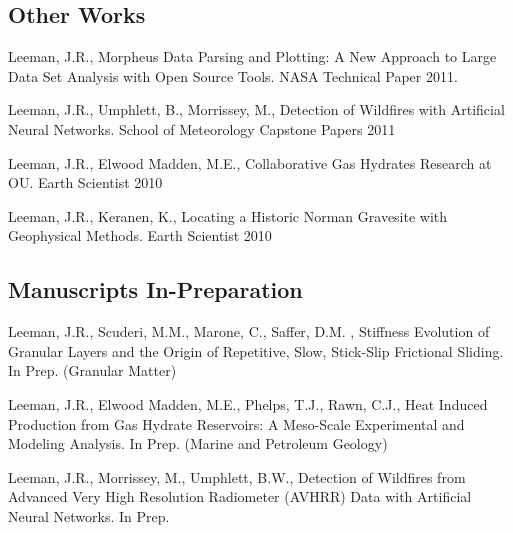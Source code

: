 \documentclass[letterpaper]{article}
\renewenvironment{itemize}{
  \begin{list}{}{
    \setlength{\leftmargin}{1.5em}
  }
}{
  \end{list}
}
\begin{document}
\subsection*{Other Works}
\begin{itemize}

\item  Leeman, J.R., Morpheus Data Parsing and Plotting: A New Approach to Large Data Set Analysis with Open Source Tools.  NASA Technical Paper 2011.

\item Leeman, J.R., Umphlett, B., Morrissey, M., Detection of Wildfires with Artificial Neural Networks.  School of Meteorology Capstone Papers 2011

\item Leeman, J.R., Elwood Madden, M.E.,  Collaborative Gas Hydrates Research at OU. Earth Scientist 2010

\item Leeman, J.R., Keranen, K., Locating a Historic Norman Gravesite with Geophysical Methods. Earth Scientist 2010

\end{itemize}

\subsection*{Manuscripts In-Preparation}
\begin{itemize}

\item Leeman, J.R., Scuderi, M.M., Marone, C., Saffer, D.M. , Stiffness Evolution of Granular Layers and the Origin of Repetitive, Slow, Stick-Slip Frictional Sliding. In Prep. (Granular Matter)

\item Leeman, J.R., Elwood Madden, M.E., Phelps, T.J., Rawn, C.J., Heat Induced Production from Gas Hydrate Reservoirs: A Meso-Scale Experimental and Modeling Analysis.  In Prep. (Marine and Petroleum Geology)

\item Leeman, J.R., Morrissey, M., Umphlett, B.W., Detection of Wildfires from Advanced Very High Resolution Radiometer (AVHRR) Data with Artificial Neural Networks.  In Prep.
\end{itemize}
\end{document}
